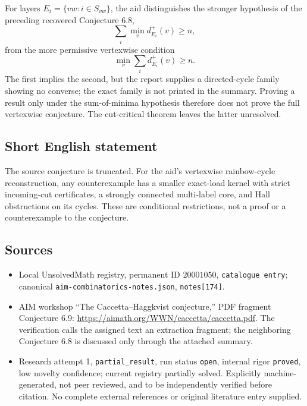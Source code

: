 \documentclass[11pt]{article}
\begin{document}
For layers $E_i=\{vw:i\in S_{vw}\}$, the aid distinguishes the stronger hypothesis of the preceding recovered Conjecture 6.8,
\[
 \sum_i\min_v d^+_{E_i}(v)\geq n,
\]
from the more permissive vertexwise condition
\[
 \min_v\sum_i d^+_{E_i}(v)\geq n.
\]
The first implies the second, but the report supplies a directed-cycle family showing no converse; the exact family is not printed in the summary. Proving a result only under the sum-of-minima hypothesis therefore does not prove the full vertexwise conjecture. The cut-critical theorem leaves the latter unresolved.
\subsection{Short English statement}
The source conjecture is truncated. For the aid's vertexwise rainbow-cycle reconstruction, any counterexample has a smaller exact-load kernel with strict incoming-cut certificates, a strongly connected multi-label core, and Hall obstructions on its cycles. These are conditional restrictions, not a proof or a counterexample to the conjecture.
\subsection{Sources}
\begin{itemize}
\item Local UnsolvedMath registry, permanent ID $20001050$, \texttt{catalogue entry}; canonical \texttt{aim-combinatorics-notes.json}, \texttt{notes[174]}.
\item AIM workshop ``The Caccetta--Haggkvist conjecture,'' PDF fragment Conjecture 6.9: \url{https://aimath.org/WWN/caccetta/caccetta.pdf}. The verification calls the assigned text an extraction fragment; the neighboring Conjecture 6.8 is discussed only through the attached summary.
\item Research attempt 1, \texttt{partial\_result}, run status \texttt{open}, internal rigor \texttt{proved}, low novelty confidence; current registry partially solved. Explicitly machine-generated, not peer reviewed, and to be independently verified before citation. No complete external references or original literature entry supplied.
\end{itemize}
\end{document}
